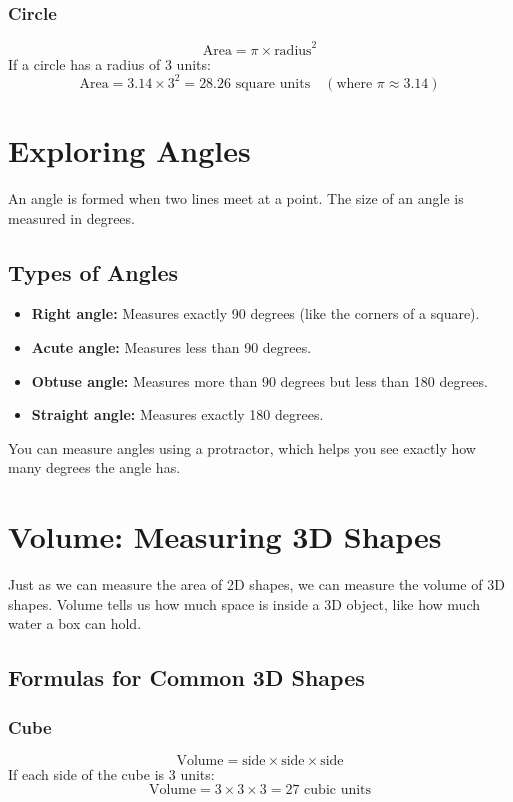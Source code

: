 \subsubsection{Circle}
\[
\text{Area} = \pi \times \text{radius}^2
\]
If a circle has a radius of 3 units:
\[
\text{Area} = 3.14 \times 3^2 = 28.26 \text{ square units} \quad (\text{where } \pi \approx 3.14)
\]

\section{Exploring Angles}
An angle is formed when two lines meet at a point. The size of an angle is measured in degrees.

\subsection{Types of Angles}
\begin{itemize}
    \item \textbf{Right angle:} Measures exactly 90 degrees (like the corners of a square).
    \item \textbf{Acute angle:} Measures less than 90 degrees.
    \item \textbf{Obtuse angle:} Measures more than 90 degrees but less than 180 degrees.
    \item \textbf{Straight angle:} Measures exactly 180 degrees.
\end{itemize}

You can measure angles using a protractor, which helps you see exactly how many degrees the angle has.

\section{Volume: Measuring 3D Shapes}
Just as we can measure the area of 2D shapes, we can measure the volume of 3D shapes. Volume tells us how much space is inside a 3D object, like how much water a box can hold.

\subsection{Formulas for Common 3D Shapes}
\subsubsection{Cube}
\[
\text{Volume} = \text{side} \times \text{side} \times \text{side}
\]
If each side of the cube is 3 units:
\[
\text{Volume} = 3 \times 3 \times 3 = 27 \text{ cubic units}
\]

